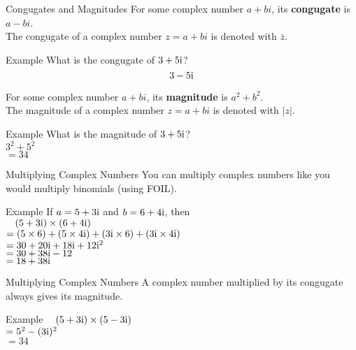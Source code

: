 \begin{namedframe}{Congugates and Magnitudes}
	For some complex number $a + bi$, its \textbf{congugate} is $a - bi$. \\
	The congugate of a complex number $z = a + bi$ is denoted with $\overline{z}$.
	\begin{exampleblock}{Example}
		What is the congugate of $3 + 5\mathrm{i}$?
		\pause
		\[3 - 5\mathrm{i}\]
	\end{exampleblock}

	\pause

	For some complex number $a + bi$, its \textbf{magnitude} is $a^2 + b^2$. \\
	The magnitude of a complex number $z = a + bi$ is denoted with $|z|$.
	\begin{exampleblock}{Example}
		What is the magnitude of $3 + 5\mathrm{i}$? \\
		\pause
		\phantom{X}$3^2 + 5^2$ \\
		$ = 34$
	\end{exampleblock}
\end{namedframe}

\begin{namedframe}{Multiplying Complex Numbers}
	You can multiply complex numbers like you would multiply binomials (using FOIL).
	\begin{exampleblock}{Example}
		If $a = 5 + 3\mathrm{i}$ and $b = 6 + 4\mathrm{i}$, then \\
		$\phantom{X}(5 + 3\mathrm{i})\times(6 + 4\mathrm{i})$ \\
		$= (5\times6) + (5\times4\mathrm{i}) + (3\mathrm{i}\times6) + (3\mathrm{i}\times4\mathrm{i})$ \\
		$= 30 + 20\mathrm{i} + 18\mathrm{i} + 12\mathrm{i}^2$ \\
		$= 30 + 38\mathrm{i} - 12$ \\
		$= 18 + 38\mathrm{i}$ \\
	\end{exampleblock}
\end{namedframe}

\begin{namedframe}{Multiplying Complex Numbers}
	A complex number multiplied by its congugate always gives its magnitude.
	\begin{exampleblock}{Example}
		$\phantom{X}(5 + 3\mathrm{i})\times(5 - 3\mathrm{i})$ \\
		$= 5^2 - (3\mathrm{i})^2$ \\
		$= 34$
	\end{exampleblock}
\end{namedframe}

